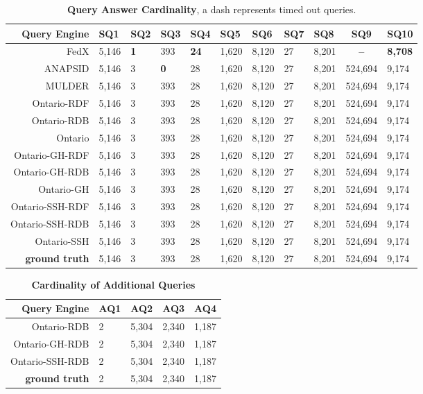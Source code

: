\begin{sidewaystable}[!htbp]
    \centering
    \small
    \begin{tabularx}{0.9\linewidth}{r Y Y Y Y Y Y Y Y c Y}
         \hline\textbf{Query Engine} &\textbf{SQ1} &\textbf{SQ2} &\textbf{SQ3} &\textbf{SQ4} &\textbf{SQ5} &\textbf{SQ6} &\textbf{SQ7} &\textbf{SQ8} &\textbf{SQ9} &\textbf{SQ10}\\\hline
         FedX &5,146 &\textbf{1} &393 &\textbf{24} &1,620 &8,120 &27 &8,201 &\textbf{--} &\textbf{8,708}\\
         ANAPSID &5,146 &3 &\textbf{0} &28 &1,620 &8,120 &27 &8,201 &524,694 &9,174\\
         MULDER &5,146 &3 &393 &28 &1,620 &8,120 &27 &8,201 &524,694 &9,174\\\hline
         Ontario-RDF &5,146 &3 &393 &28 &1,620 &8,120 &27 &8,201 &524,694 &9,174\\
         Ontario-RDB &5,146 &3 &393 &28 &1,620 &8,120 &27 &8,201 &524,694 &9,174\\
         Ontario &5,146 &3 &393 &28 &1,620 &8,120 &27 &8,201 &524,694 &9,174\\\hline
         Ontario-GH-RDF &5,146 &3 &393 &28 &1,620 &8,120 &27 &8,201 &524,694 &9,174\\
         Ontario-GH-RDB &5,146 &3 &393 &28 &1,620 &8,120 &27 &8,201 &524,694 &9,174\\
         Ontario-GH &5,146 &3 &393 &28 &1,620 &8,120 &27 &8,201 &524,694 &9,174\\\hline
         Ontario-SSH-RDF &5,146 &3 &393 &28 &1,620 &8,120 &27 &8,201 &524,694 &9,174\\
         Ontario-SSH-RDB &5,146 &3 &393 &28 &1,620 &8,120 &27 &8,201 &524,694 &9,174\\
         Ontario-SSH &5,146 &3 &393 &28 &1,620 &8,120 &27 &8,201 &524,694 &9,174\\\hline
         \textbf{ground truth} &5,146 &3 &393 &28 &1,620 &8,120 &27 &8,201 &524,694 &9,174\\\hline
    \end{tabularx}
    \caption[Query Answer Cardinality]{\textbf{Query Answer Cardinality}, a dash represents timed out queries.}
    \label{tab:cardinality}
\end{sidewaystable}

\begin{table}[!hp]
    \centering
    \begin{tabularx}{0.66\linewidth}{r Y Y Y Y}
        \hline\textbf{Query Engine} &\textbf{AQ1} &\textbf{AQ2} &\textbf{AQ3} &\textbf{AQ4}\\\hline
        Ontario-RDB &2 &5,304 &2,340 &1,187\\
        Ontario-GH-RDB &2 &5,304 &2,340 &1,187\\
        Ontario-SSH-RDB &2 &5,304 &2,340 &1,187\\\hline
        \textbf{ground truth} &2 &5,304 &2,340 &1,187
    \end{tabularx}
    \caption[Cardinality of Additional Queries]{\textbf{Cardinality of Additional Queries}}
    \label{tab:cardinality:aq}
\end{table}

